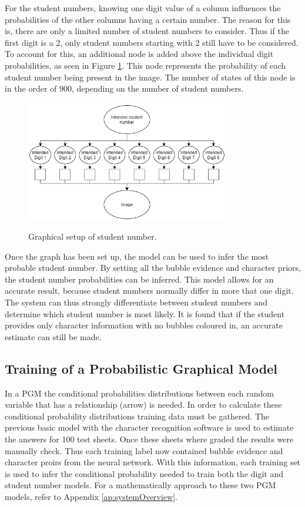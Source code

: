 For the student numbers, knowing one digit value of a column influences the probabilities of the other columns having a certain number. The reason for this is, there are only a limited number of student numbers to consider. Thus if the first digit is a 2, only student numbers starting with 2 still have to be considered. To account for this, an additional node is added above the individual digit probabilities, as seen in Figure \ref{fig:stdNumCh4}. This node represents the probability of each student number being present in the image. The number of states of this node is in the order of $ 900$, depending on the number of student numbers.
\begin{figure}[b]
  \centering
  \includegraphics[width=8.9cm]{stdNum}\\
  \caption{Graphical setup of student number.}
  \label{fig:stdNumCh4}
\end{figure}
Once the graph has been set up, the model can be used to infer the most probable student number. By setting all the bubble evidence and character priors, the student number probabilities can be inferred. This model allows for an accurate result, because student numbers normally differ in more that one digit. The system can thus strongly differentiate between student numbers and determine which student number is most likely. It is found that if the student provides only character information with no bubbles coloured in, an accurate estimate can still be made.

\subsection{Training of a Probabilistic Graphical Model}
In a PGM the conditional probabilities distributions between each random variable that has a relationship (arrow) is needed. In order to calculate these conditional probability distributions training data must be gathered. The previous basic model with the character recognition software is used to estimate the answers for 100 test sheets. Once these sheets where graded the results were manually check. Thus each training label now contained bubble evidence and character proirs from the neural network. With this information, each training set is used to infer the conditional probability needed to train both the digit and student number models. For a mathematically approach to these two PGM models, refer to Appendix \ref{ap:systemOverview}.

